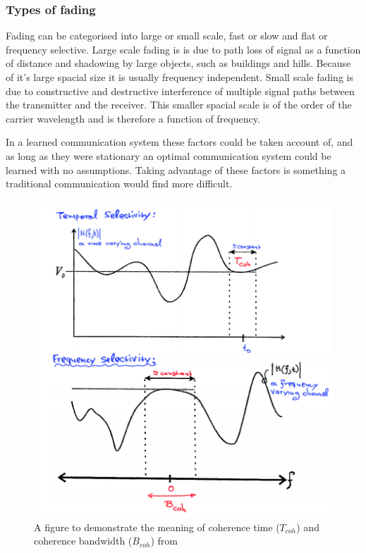\documentclass[12pt,onecolumn,letterpaper]{article}
\begin{document}
\subsubsection{Types of fading}

Fading can be categorised into large or small scale, fast or slow and flat or frequency selective. Large scale fading is is due to path loss of signal as a function of distance and shadowing by large objects, such as buildings and hills. Because of it's large spacial size it is usually frequency independent. Small scale fading is due to constructive and destructive interference of multiple signal paths between the transmitter and the receiver. This smaller spacial scale is of the order of the carrier wavelength and is therefore a function of frequency. 

In a learned communication system these factors could be taken account of, and as long as they were stationary an optimal communication system could be learned with no assumptions. Taking advantage of these factors is something a traditional communication would find more difficult.

\begin{figure}[t]
\begin{center}
   \includegraphics[width=0.8\linewidth]{figures/time_freq_coherence.PNG}
\end{center}
   \caption{A figure to demonstrate the meaning of coherence time ($T_{coh}$) and coherence bandwidth ($B_{coh}$) from~\cite{EE3CommsSystemsNotesL4}}
\label{fig:coherence_illus}
\end{figure}
\end{document}
